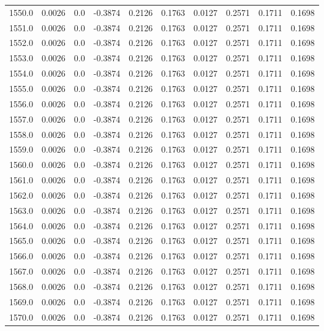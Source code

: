 \begin{longtable}{lrrrrrrrrr}
1550.0 & 0.0026 & 0.0 & -0.3874 & 0.2126 & 0.1763 & 0.0127 & 0.2571 & 0.1711 & 0.1698 \\
1551.0 & 0.0026 & 0.0 & -0.3874 & 0.2126 & 0.1763 & 0.0127 & 0.2571 & 0.1711 & 0.1698 \\
1552.0 & 0.0026 & 0.0 & -0.3874 & 0.2126 & 0.1763 & 0.0127 & 0.2571 & 0.1711 & 0.1698 \\
1553.0 & 0.0026 & 0.0 & -0.3874 & 0.2126 & 0.1763 & 0.0127 & 0.2571 & 0.1711 & 0.1698 \\
1554.0 & 0.0026 & 0.0 & -0.3874 & 0.2126 & 0.1763 & 0.0127 & 0.2571 & 0.1711 & 0.1698 \\
1555.0 & 0.0026 & 0.0 & -0.3874 & 0.2126 & 0.1763 & 0.0127 & 0.2571 & 0.1711 & 0.1698 \\
1556.0 & 0.0026 & 0.0 & -0.3874 & 0.2126 & 0.1763 & 0.0127 & 0.2571 & 0.1711 & 0.1698 \\
1557.0 & 0.0026 & 0.0 & -0.3874 & 0.2126 & 0.1763 & 0.0127 & 0.2571 & 0.1711 & 0.1698 \\
1558.0 & 0.0026 & 0.0 & -0.3874 & 0.2126 & 0.1763 & 0.0127 & 0.2571 & 0.1711 & 0.1698 \\
1559.0 & 0.0026 & 0.0 & -0.3874 & 0.2126 & 0.1763 & 0.0127 & 0.2571 & 0.1711 & 0.1698 \\
1560.0 & 0.0026 & 0.0 & -0.3874 & 0.2126 & 0.1763 & 0.0127 & 0.2571 & 0.1711 & 0.1698 \\
1561.0 & 0.0026 & 0.0 & -0.3874 & 0.2126 & 0.1763 & 0.0127 & 0.2571 & 0.1711 & 0.1698 \\
1562.0 & 0.0026 & 0.0 & -0.3874 & 0.2126 & 0.1763 & 0.0127 & 0.2571 & 0.1711 & 0.1698 \\
1563.0 & 0.0026 & 0.0 & -0.3874 & 0.2126 & 0.1763 & 0.0127 & 0.2571 & 0.1711 & 0.1698 \\
1564.0 & 0.0026 & 0.0 & -0.3874 & 0.2126 & 0.1763 & 0.0127 & 0.2571 & 0.1711 & 0.1698 \\
1565.0 & 0.0026 & 0.0 & -0.3874 & 0.2126 & 0.1763 & 0.0127 & 0.2571 & 0.1711 & 0.1698 \\
1566.0 & 0.0026 & 0.0 & -0.3874 & 0.2126 & 0.1763 & 0.0127 & 0.2571 & 0.1711 & 0.1698 \\
1567.0 & 0.0026 & 0.0 & -0.3874 & 0.2126 & 0.1763 & 0.0127 & 0.2571 & 0.1711 & 0.1698 \\
1568.0 & 0.0026 & 0.0 & -0.3874 & 0.2126 & 0.1763 & 0.0127 & 0.2571 & 0.1711 & 0.1698 \\
1569.0 & 0.0026 & 0.0 & -0.3874 & 0.2126 & 0.1763 & 0.0127 & 0.2571 & 0.1711 & 0.1698 \\
1570.0 & 0.0026 & 0.0 & -0.3874 & 0.2126 & 0.1763 & 0.0127 & 0.2571 & 0.1711 & 0.1698 \\

\end{longtable}
